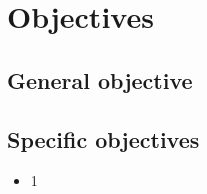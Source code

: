 \section{Objectives}

\subsection{General objective}

\subsection{Specific objectives}

\begin{itemize}
    \item 1
\end{itemize}